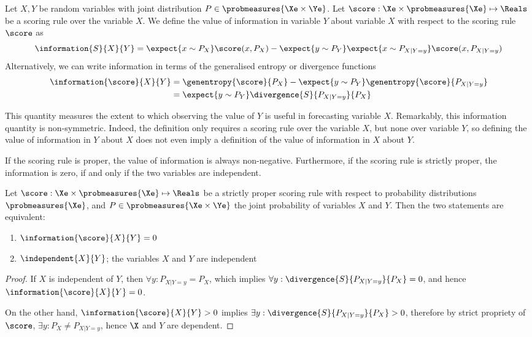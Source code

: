\begin{definition}
	\label{def:value_of_information}
	Let $X,Y$ be random variables with joint distribution $P\in\probmeasures{\Xe\times\Ye}$. Let $\score:\Xe\times\probmeasures{\Xe}\mapsto\Reals$ be a scoring rule over the variable $X$. We define the value of information in variable $Y$ about variable $X$ with respect to the scoring rule $\score$ as
	\begin{equation}
		\information{S}{X}{Y} =  \expect{x\sim P_{X}}\score(x,P_{X})- \expect{y\sim P_{Y}} \expect{x\sim P_{X\vert Y=y}}\score(x,P_{X\vert Y=y})
	\end{equation}
	Alternatively, we can write information in terms of the generalised entropy or divergence functions
		\begin{align}
			\information{\score}{X}{Y} &=  \genentropy{\score}{P_{X}} - \expect{y \sim P_{Y}} \genentropy{\score}{P_{X\vert Y=y}}\\
				&= \expect{y\sim P_{Y}}\divergence{S}{P_{X\vert Y=y}}{P_{X}}
		\end{align}
\end{definition}

This quantity measures the extent to which observing the value of $Y$ is useful in forecasting variable $X$. Remarkably, this information quantity is non-symmetric. Indeed, the definition only requires a scoring rule over the variable $X$, but none over variable $Y$, so defining the value of information in $Y$ about $X$ does not even imply a definition of the value of information in $X$ about $Y$.

If the scoring rule is proper, the value of information is always non-negative. Furthermore, if the scoring rule is strictly proper, the information is zero, if and only if the two variables are independent.

\begin{theorem}
	Let $\score:\Xe\times\probmeasures{\Xe}\mapsto\Reals$ be a strictly proper scoring rule with respect to probability distributions $\probmeasures{\Xe}$, and $P\in\probmeasures{\Xe\times\Ye}$ the joint probability of variables $X$ and $Y$. Then the two statements are equivalent:
	\begin{enumerate}
		\item $\information{\score}{X}{Y} = 0$
		\item $\independent{X}{Y}$; the variables $X$ and $Y$ are independent
	\end{enumerate}
	\begin{proof}
		If $X$ is independent of $Y$, then $\forall y: P_{X\vert Y=y} = P_{X}$, which implies $\forall y:  \divergence{S}{P_{X\vert Y=y}}{P_{X}}=0$, and hence $\information{\score}{X}{Y} = 0$.
		
		On the other hand, $\information{\score}{X}{Y} > 0$ implies $\exists y: \divergence{S}{P_{X\vert Y=y}}{P_{X}} > 0$, therefore by strict propriety of $\score$, $\exists y: P_X \neq P_{X\vert Y=y}$, hence $\X$ and $Y$ are dependent.
	\end{proof}
\end{theorem}

